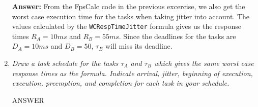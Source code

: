 \documentclass[a4paper,10pt]{article}
\newcommand{\answer}{\textbf{Answer: }}
\begin{document}
\begin{enumerate}
	\answer From the FpsCalc code in the previous excercise, we also get the worst case execution time for the tasks when taking jitter into account. The values calculated by the \texttt{WCRespTimeJitter} formula gives us the response times $R_A = 10 ms$ and $R_B = 55 ms$. Since the deadlines for the tasks are $D_A = 10 ms$ and $D_B = 50$, $\tau_B$ will miss its deadline.

	\item \emph{Draw a task schedule for the tasks $\tau_A$ and $\tau_B$ which gives the same worst case response times as the formula. Indicate arrival, jitter, beginning of execution, execution, preemption, and completion for each task in your schedule.}
	
	ANSWER
\end{enumerate}
\end{document}
